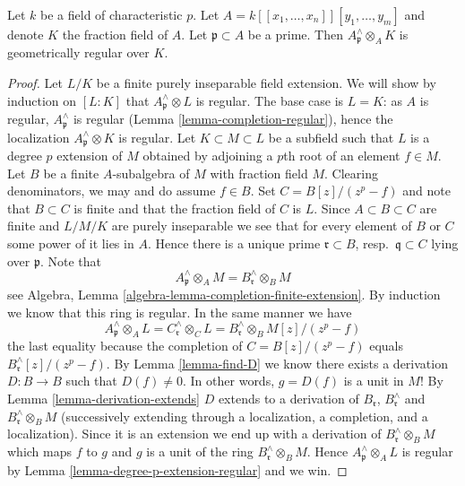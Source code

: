 \begin{lemma}
\label{lemma-helper-G-ring}
Let $k$ be a field of characteristic $p$.
Let $A = k[[x_1, \ldots, x_n]][y_1, \ldots, y_m]$ and denote $K$
the fraction field of $A$.
Let $\mathfrak p \subset A$ be a prime. Then
$A_\mathfrak p^\wedge \otimes_A K$ is geometrically regular over $K$.
\end{lemma}

\begin{proof}
Let $L/K$ be a finite purely inseparable field extension.
We will show by induction on $[L : K]$ that $A_\mathfrak p^\wedge \otimes L$
is regular. The base case is $L = K$: as $A$ is regular,
$A_\mathfrak p^\wedge$ is regular (Lemma \ref{lemma-completion-regular}),
hence the localization $A_\mathfrak p^\wedge \otimes K$ is regular.
Let $K \subset M \subset L$ be a subfield such that
$L$ is a degree $p$ extension of $M$ obtained by adjoining a $p$th root
of an element $f \in M$. Let $B$ be a finite $A$-subalgebra
of $M$ with fraction field $M$. Clearing denominators, we may and do assume
$f \in B$. Set $C = B[z]/(z^p -f)$ and note that $B \subset C$
is finite and that the fraction field of $C$ is $L$. Since
$A \subset B \subset C$ are finite and $L/M/K$ are purely
inseparable we see that for every element of $B$ or $C$ some power of
it lies in $A$. Hence there is a unique prime $\mathfrak r \subset B$,
resp.\ $\mathfrak q \subset C$ lying over $\mathfrak p$. Note that
$$
A_\mathfrak p^\wedge \otimes_A M = B_\mathfrak r^\wedge \otimes_B M
$$
see Algebra, Lemma \ref{algebra-lemma-completion-finite-extension}.
By induction we know that this ring is regular. In the same manner we have
$$
A_\mathfrak p^\wedge \otimes_A L =
C_\mathfrak r^\wedge \otimes_C L =
B_\mathfrak r^\wedge \otimes_B M[z]/(z^p - f)
$$
the last equality because the completion of
$C = B[z]/(z^p - f)$ equals $B_\mathfrak r^\wedge[z]/(z^p -f)$.
By Lemma \ref{lemma-find-D} we know there exists a derivation
$D : B \to B$ such that $D(f) \not = 0$. In other words, $g = D(f)$
is a unit in $M$! By Lemma \ref{lemma-derivation-extends}
$D$ extends to a derivation of $B_\mathfrak r$, $B_\mathfrak r^\wedge$
and $B_\mathfrak r^\wedge \otimes_B M$ (successively extending through a
localization, a completion, and a localization). Since it is an
extension we end up with a derivation of $B_\mathfrak r^\wedge \otimes_B M$
which maps $f$ to $g$ and $g$ is a unit of the ring
$B_\mathfrak r^\wedge \otimes_B M$.
Hence $A_\mathfrak p^\wedge \otimes_A L$ is regular by
Lemma \ref{lemma-degree-p-extension-regular} and we win.
\end{proof}
